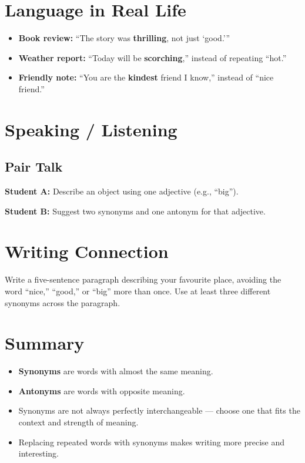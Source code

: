 \section{Language in Real Life}
\begin{itemize}
    \item \textbf{Book review:} ``The story was \textbf{thrilling}, not just `good.'''
    \item \textbf{Weather report:} ``Today will be \textbf{scorching},'' instead of repeating ``hot.''
    \item \textbf{Friendly note:} ``You are the \textbf{kindest} friend I know,'' instead of ``nice friend.''
\end{itemize}

\section{Speaking / Listening}
\subsection*{Pair Talk}
\textbf{Student A:} Describe an object using one adjective (e.g., ``big'').

\textbf{Student B:} Suggest two synonyms and one antonym for that adjective.

\section{Writing Connection}
Write a five-sentence paragraph describing your favourite place, avoiding the word ``nice,'' ``good,'' or ``big'' more than once. Use at least three different synonyms across the paragraph.

\section{Summary}
\begin{summarybox}
\begin{itemize}
    \item \textbf{Synonyms} are words with almost the same meaning.
    \item \textbf{Antonyms} are words with opposite meaning.
    \item Synonyms are not always perfectly interchangeable --- choose one that fits the context and strength of meaning.
    \item Replacing repeated words with synonyms makes writing more precise and interesting.
\end{itemize}
\end{summarybox}

